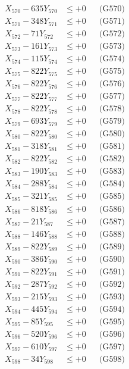 \documentclass[a4paper,10pt]{article}
\begin{document}
{\begin{align}
X_{570} - 635Y_{570} &\leq +0 && \text{(G570)} \\
\allowbreak
X_{571} - 348Y_{571} &\leq +0 && \text{(G571)} \\
X_{572} - 71Y_{572} &\leq +0 && \text{(G572)} \\
X_{573} - 161Y_{573} &\leq +0 && \text{(G573)} \\
X_{574} - 115Y_{574} &\leq +0 && \text{(G574)} \\
X_{575} - 822Y_{575} &\leq +0 && \text{(G575)} \\
X_{576} - 822Y_{576} &\leq +0 && \text{(G576)} \\
X_{577} - 822Y_{577} &\leq +0 && \text{(G577)} \\
X_{578} - 822Y_{578} &\leq +0 && \text{(G578)} \\
X_{579} - 693Y_{579} &\leq +0 && \text{(G579)} \\
X_{580} - 822Y_{580} &\leq +0 && \text{(G580)} \\
\allowbreak
X_{581} - 318Y_{581} &\leq +0 && \text{(G581)} \\
X_{582} - 822Y_{582} &\leq +0 && \text{(G582)} \\
X_{583} - 190Y_{583} &\leq +0 && \text{(G583)} \\
X_{584} - 288Y_{584} &\leq +0 && \text{(G584)} \\
X_{585} - 321Y_{585} &\leq +0 && \text{(G585)} \\
X_{586} - 818Y_{586} &\leq +0 && \text{(G586)} \\
X_{587} - 21Y_{587} &\leq +0 && \text{(G587)} \\
X_{588} - 146Y_{588} &\leq +0 && \text{(G588)} \\
X_{589} - 822Y_{589} &\leq +0 && \text{(G589)} \\
X_{590} - 386Y_{590} &\leq +0 && \text{(G590)} \\
\allowbreak
X_{591} - 822Y_{591} &\leq +0 && \text{(G591)} \\
X_{592} - 287Y_{592} &\leq +0 && \text{(G592)} \\
X_{593} - 215Y_{593} &\leq +0 && \text{(G593)} \\
X_{594} - 445Y_{594} &\leq +0 && \text{(G594)} \\
X_{595} - 85Y_{595} &\leq +0 && \text{(G595)} \\
X_{596} - 520Y_{596} &\leq +0 && \text{(G596)} \\
X_{597} - 610Y_{597} &\leq +0 && \text{(G597)} \\
X_{598} - 34Y_{598} &\leq +0 && \text{(G598)} \\

\end{align}}
\end{document}
